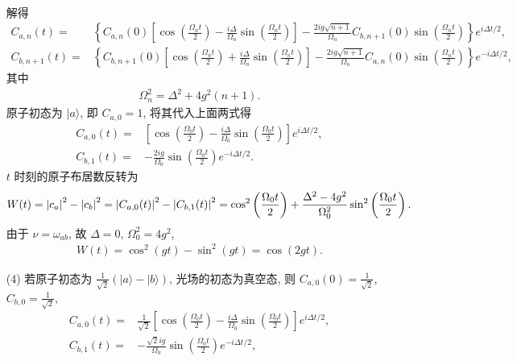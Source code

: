 \documentclass{assignment}
\begin{document}
\begin{sol}
\begin{itemize}
\begin{align}
        \end{align}
        解得
        \begin{align}
            C_{a,n}(t)=&\left\{C_{a,n}(0)\left[\cos\left(\frac{\Omega_nt}{2}\right)-\frac{i\Delta}{\Omega_n}\sin\left(\frac{\Omega_nt}{2}\right)\right]-\frac{2ig\sqrt{n+1}}{\Omega_n}C_{b,n+1}(0)\sin\left(\frac{\Omega_nt}{2}\right)\right\}e^{i\Delta t/2},\\
            C_{b,n+1}(t)=&\left\{C_{b,n+1}(0)\left[\cos\left(\frac{\Omega_nt}{2}\right)+\frac{i\Delta}{\Omega_n}\sin\left(\frac{\Omega_nt}{2}\right)\right]-\frac{2ig\sqrt{n+1}}{\Omega_n}C_{a,n}(0)\sin\left(\frac{\Omega_nt}{2}\right)\right\}e^{-i\Delta t/2},
        \end{align}
        其中
        \begin{align}
            \Omega_n^2=\Delta^2+4g^2(n+1).
        \end{align}
        原子初态为 $\lvert a\rangle$, 即 $C_{a,0}=1$, 将其代入上面两式得
        \begin{align}
            C_{a,0}(t)=&\left[\cos\left(\frac{\Omega_0t}{2}\right)-\frac{i\Delta}{\Omega_0}\sin\left(\frac{\Omega_0t}{2}\right)\right]e^{i\Delta t/2},\\
            C_{b,1}(t)=&-\frac{2ig}{\Omega_0}\sin\left(\frac{\Omega_0t}{2}\right)e^{-i\Delta t/2}.
        \end{align}
        $t$ 时刻的原子布居数反转为
        \begin{align}
            W(t)=\left\lvert c_a\right\rvert^2-\left\lvert c_b\right\rvert^2=\left\lvert C_{a,0}(t)\right\rvert^2-\left\lvert C_{b,1}(t)\right\rvert^2=\cos^2\left(\frac{\Omega_0t}{2}\right)+\frac{\Delta^2-4g^2}{\Omega_0^2}\sin^2\left(\frac{\Omega_0t}{2}\right).
        \end{align}
        由于 $\nu=\omega_{ab}$, 故 $\Delta=0$, $\Omega_0^2=4g^2$,
        \begin{align}
            W(t)=\cos^2(gt)-\sin^2(gt)=\cos(2gt).
        \end{align}
        \item[(4)] 若原子初态为 $\frac{1}{\sqrt{2}}(\lvert a\rangle-\lvert b\rangle)$, 光场的初态为真空态, 则 $C_{a,0}(0)=\frac{1}{\sqrt{2}}$, $C_{b,0}=\frac{1}{\sqrt{2}}$,
        \begin{align}
            C_{a,0}(t)=&\frac{1}{\sqrt{2}}\left[\cos\left(\frac{\Omega_0t}{2}\right)-\frac{i\Delta}{\Omega_0}\sin\left(\frac{\Omega_0t}{2}\right)\right]e^{i\Delta t/2},\\
            C_{b,1}(t)=&-\frac{\sqrt{2}ig}{\Omega_0}\sin\left(\frac{\Omega_0t}{2}\right)e^{-i\Delta t/2},\\

\end{align}
\end{itemize}
\end{sol}
\end{document}

